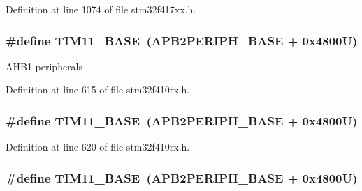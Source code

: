 Definition at line 1074 of file stm32f417xx.\+h.

\subsubsection[{\texorpdfstring{T\+I\+M11\+\_\+\+B\+A\+SE}{TIM11_BASE}}]{\setlength{\rightskip}{0pt plus 5cm}\#define T\+I\+M11\+\_\+\+B\+A\+SE~({\bf A\+P\+B2\+P\+E\+R\+I\+P\+H\+\_\+\+B\+A\+SE} + 0x4800\+U)}\hypertarget{group___peripheral__registers__structures_ga3a4a06bb84c703084f0509e105ffaf1d}{}\label{group___peripheral__registers__structures_ga3a4a06bb84c703084f0509e105ffaf1d}
A\+H\+B1 peripherals 

Definition at line 615 of file stm32f410tx.\+h.

\subsubsection[{\texorpdfstring{T\+I\+M11\+\_\+\+B\+A\+SE}{TIM11_BASE}}]{\setlength{\rightskip}{0pt plus 5cm}\#define T\+I\+M11\+\_\+\+B\+A\+SE~({\bf A\+P\+B2\+P\+E\+R\+I\+P\+H\+\_\+\+B\+A\+SE} + 0x4800\+U)}\hypertarget{group___peripheral__registers__structures_ga3a4a06bb84c703084f0509e105ffaf1d}{}\label{group___peripheral__registers__structures_ga3a4a06bb84c703084f0509e105ffaf1d}


Definition at line 620 of file stm32f410rx.\+h.

\subsubsection[{\texorpdfstring{T\+I\+M11\+\_\+\+B\+A\+SE}{TIM11_BASE}}]{\setlength{\rightskip}{0pt plus 5cm}\#define T\+I\+M11\+\_\+\+B\+A\+SE~({\bf A\+P\+B2\+P\+E\+R\+I\+P\+H\+\_\+\+B\+A\+SE} + 0x4800\+U)}\hypertarget{group___peripheral__registers__structures_ga3a4a06bb84c703084f0509e105ffaf1d}{}\label{group___peripheral__registers__structures_ga3a4a06bb84c703084f0509e105ffaf1d}


